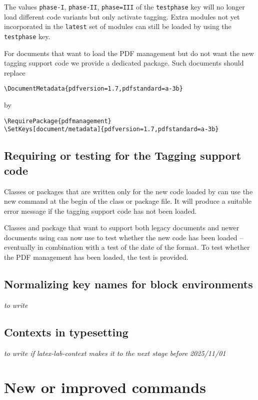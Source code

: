 \documentclass{ltnews}
\begin{document}
The values \texttt{phase-I}, \texttt{phase-II}, \texttt{phase=III} of the 
\texttt{testphase} key will no longer load different code variants but only 
activate tagging. Extra modules not yet incorporated in the \texttt{latest} set of 
modules can still be loaded by using  the \texttt{testphase} key.
 
For documents that want to load the PDF management but do not want the new tagging support 
code we provide a dedicated package. Such documents should replace
\begin{verbatim}
\DocumentMetadata{pdfversion=1.7,pdfstandard=a-3b}
\end{verbatim}
by
\begin{verbatim}
\RequirePackage{pdfmanagement}
\SetKeys[document/metadata]{pdfversion=1.7,pdfstandard=a-3b}
\end{verbatim}

 
\subsection{Requiring or testing for the Tagging support code}
Classes or packages that are written only for the new code loaded by
 can use the new command  at the begin 
of the class or package file. It will produce a suitable error message if
the tagging support code has not been loaded.
 
Classes and package that want to support both legacy documents and newer documents 
using  can now use  to test whether the 
new code has been loaded -- eventually in combination with a test of the date of 
the format. To test whether the PDF management has been loaded, the test 
 is provided.
 

\subsection{Normalizing key names for block environments}

\emph{to write}


\subsection{Contexts in typesetting}

\emph{to write if latex-lab-context makes it to the next stage before 2025/11/01}


\section{New or improved commands}
\end{document}
